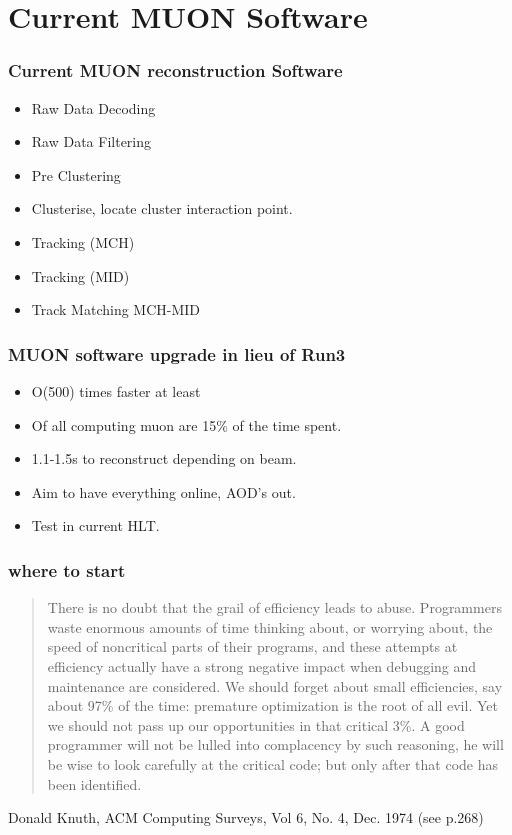 \documentclass{beamer}
\begin{document}
\section{Current MUON Software}

\begin{frame}
\frametitle{Current MUON reconstruction Software}
\begin{itemize}
  \item Raw Data Decoding
  \item Raw Data Filtering
  \item Pre Clustering 
  \item Clusterise, locate cluster interaction point.
  \item Tracking (MCH)
  \item Tracking (MID)
  \item Track Matching MCH-MID
\end{itemize}
\end{frame}
\begin{frame}
  \frametitle{MUON software upgrade in lieu of Run3}
  \begin{itemize}
    \item O(500) times faster at least
    \item Of all computing muon are 15\% of the time spent.
    \item 1.1-1.5s to reconstruct depending on beam.
    \item Aim to have everything online, AOD's out.
    \item Test in current HLT.
  \end{itemize}
\end{frame}
\begin{frame}
  \frametitle{where to start}
  \begin{quote}
\small{There is no doubt that the grail of efficiency leads to abuse. Programmers waste enormous amounts of time thinking about, or worrying about, the speed of noncritical parts of their programs, and these attempts at efficiency actually have a strong negative impact when debugging and maintenance are considered. We should forget about small efficiencies, say about 97\% of the time: premature optimization is the root of all evil.
Yet we should not pass up our opportunities in that critical 3\%. A good programmer will not be lulled into complacency by such reasoning, he will be wise to look carefully at the critical code; but only after that code has been identified.}  
  \end{quote}
Donald Knuth, ACM Computing Surveys, Vol 6, No. 4, Dec. 1974 (see p.268)
\end{frame}
\end{document}
